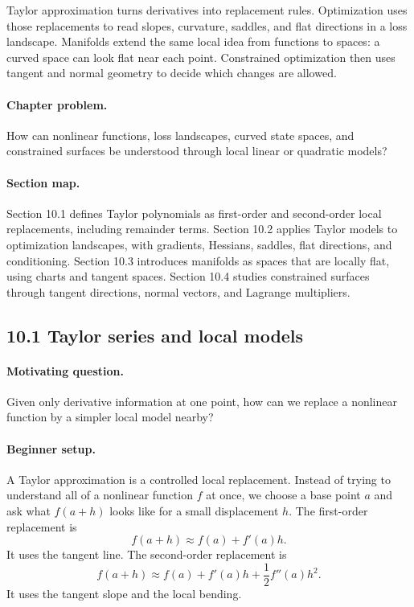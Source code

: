 Taylor approximation turns derivatives into replacement rules. Optimization uses those replacements to read slopes, curvature, saddles, and flat directions in a loss landscape. Manifolds extend the same local idea from functions to spaces: a curved space can look flat near each point. Constrained optimization then uses tangent and normal geometry to decide which changes are allowed.

\paragraph{Chapter problem.}
How can nonlinear functions, loss landscapes, curved state spaces, and constrained surfaces be understood through local linear or quadratic models?

\paragraph{Section map.}
Section 10.1 defines Taylor polynomials as first-order and second-order local replacements, including remainder terms. Section 10.2 applies Taylor models to optimization landscapes, with gradients, Hessians, saddles, flat directions, and conditioning. Section 10.3 introduces manifolds as spaces that are locally flat, using charts and tangent spaces. Section 10.4 studies constrained surfaces through tangent directions, normal vectors, and Lagrange multipliers.

\subsection{10.1 Taylor series and local models}

\paragraph{Motivating question.}
Given only derivative information at one point, how can we replace a nonlinear function by a simpler local model nearby?

\paragraph{Beginner setup.}
A Taylor approximation is a controlled local replacement. Instead of trying to understand all of a nonlinear function \(f\) at once, we choose a base point \(a\) and ask what \(f(a+h)\) looks like for a small displacement \(h\). The first-order replacement is
\[
f(a+h)\approx f(a)+f'(a)h.
\]
It uses the tangent line. The second-order replacement is
\[
f(a+h)\approx f(a)+f'(a)h+\frac{1}{2}f''(a)h^2.
\]
It uses the tangent slope and the local bending.

